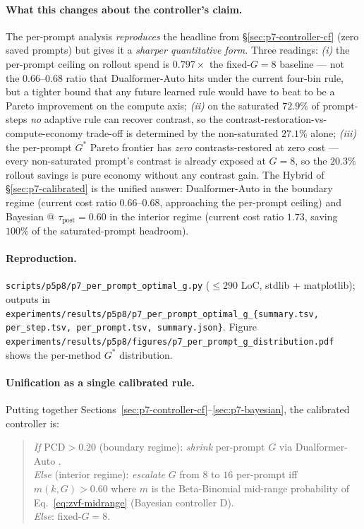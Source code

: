 \paragraph{What this changes about the controller's claim.}
The per-prompt analysis \emph{reproduces} the headline from
\S\ref{sec:p7-controller-cf} (zero saved prompts) but gives it a
\emph{sharper quantitative form}. Three readings:
\emph{(i)} the per-prompt ceiling on rollout spend is $0.797\times$ the
fixed-$G{=}8$ baseline --- not the $0.66$--$0.68$ ratio that Dualformer-Auto
hits under the current four-bin rule, but a tighter bound that any future
learned rule would have to beat to be a Pareto improvement on the
compute axis; \emph{(ii)} on the saturated $72.9\%$ of prompt-steps
\emph{no} adaptive rule can recover contrast, so the
contrast-restoration-vs-compute-economy trade-off is determined by the
non-saturated $27.1\%$ alone; \emph{(iii)} the per-prompt $G^*$ Pareto
frontier has \emph{zero} contrasts-restored at zero cost --- every
non-saturated prompt's contrast is already exposed at $G{=}8$, so the
$20.3\%$ rollout savings is pure economy without any contrast gain.
The Hybrid of \S\ref{sec:p7-calibrated} is the unified answer: Dualformer-Auto
in the boundary regime (current cost ratio $0.66$--$0.68$, approaching
the per-prompt ceiling) and Bayesian @ $\tau_\text{post} = 0.60$ in the
interior regime (current cost ratio $1.73$, saving $100\%$ of the
saturated-prompt headroom).

\paragraph{Reproduction.}
\texttt{scripts/p5p8/p7\_per\_prompt\_optimal\_g.py} ($\leq 290$ LoC,
stdlib + matplotlib); outputs in
\texttt{experiments/results/p5p8/p7\_per\_prompt\_optimal\_g\_\{summary.tsv,
per\_step.tsv, per\_prompt.tsv, summary.json\}}.  Figure
\texttt{experiments/results/p5p8/figures/p7\_per\_prompt\_g\_distribution.pdf}
shows the per-method $G^*$ distribution.

\paragraph{Unification as a single calibrated rule.}
Putting together Sections~\ref{sec:p7-controller-cf}--\ref{sec:p7-bayesian},
the calibrated controller is:

\begin{quote}\small
\emph{If} $\mathrm{PCD} > 0.20$ (boundary regime): \emph{shrink} per-prompt
$G$ via Dualformer-Auto \citep{su2024dualformer}. \\
\emph{Else} (interior regime): \emph{escalate} $G$ from $8$ to $16$ per-prompt
iff $m(k, G) > 0.60$ where $m$ is the Beta-Binomial mid-range probability
of Eq.~\eqref{eq:zvf-midrange} (Bayesian controller D). \\
\emph{Else}: fixed-$G{=}8$.
\end{quote}

